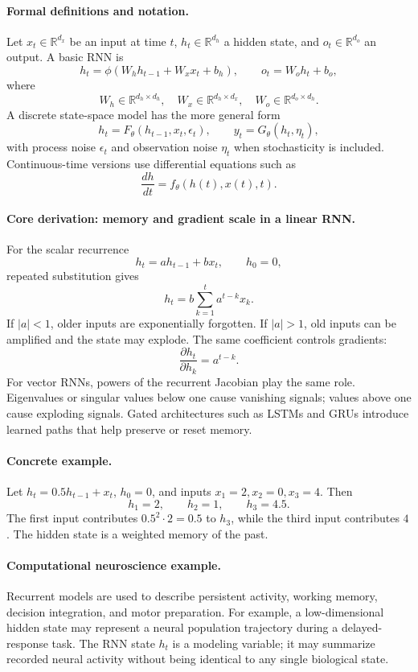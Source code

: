 \paragraph{Formal definitions and notation.}
Let \(x_t\in\mathbb{R}^{d_x}\) be an input at time \(t\), \(h_t\in\mathbb{R}^{d_h}\) a hidden state, and \(o_t\in\mathbb{R}^{d_o}\) an output. A basic RNN is
\[
h_t=\phi(W_h h_{t-1}+W_x x_t+b_h),
\qquad
o_t=W_o h_t+b_o,
\]
where
\[
W_h\in\mathbb{R}^{d_h\times d_h},
\quad
W_x\in\mathbb{R}^{d_h\times d_x},
\quad
W_o\in\mathbb{R}^{d_o\times d_h}.
\]
A discrete state-space model has the more general form
\[
h_t=F_\theta(h_{t-1},x_t,\epsilon_t),
\qquad
y_t=G_\theta(h_t,\eta_t),
\]
with process noise \(\epsilon_t\) and observation noise \(\eta_t\) when stochasticity is included. Continuous-time versions use differential equations such as
\[
\frac{dh}{dt}=f_\theta(h(t),x(t),t).
\]

\paragraph{Core derivation: memory and gradient scale in a linear RNN.}
For the scalar recurrence
\[
h_t=ah_{t-1}+bx_t,\qquad h_0=0,
\]
repeated substitution gives
\[
h_t=b\sum_{k=1}^{t}a^{t-k}x_k.
\]
If \(|a|<1\), older inputs are exponentially forgotten. If \(|a|>1\), old inputs can be amplified and the state may explode. The same coefficient controls gradients:
\[
\frac{\partial h_t}{\partial h_k}=a^{t-k}.
\]
For vector RNNs, powers of the recurrent Jacobian play the same role. Eigenvalues or singular values below one cause vanishing signals; values above one cause exploding signals. Gated architectures such as LSTMs and GRUs introduce learned paths that help preserve or reset memory.

\paragraph{Concrete example.}
Let \(h_t=0.5h_{t-1}+x_t\), \(h_0=0\), and inputs \(x_1=2,x_2=0,x_3=4\). Then
\[
h_1=2,\qquad
h_2=1,\qquad
h_3=4.5.
\]
The first input contributes \(0.5^2\cdot2=0.5\) to \(h_3\), while the third input contributes \(4\). The hidden state is a weighted memory of the past.

\paragraph{Computational neuroscience example.}
Recurrent models are used to describe persistent activity, working memory, decision integration, and motor preparation. For example, a low-dimensional hidden state may represent a neural population trajectory during a delayed-response task. The RNN state \(h_t\) is a modeling variable; it may summarize recorded neural activity without being identical to any single biological state.

